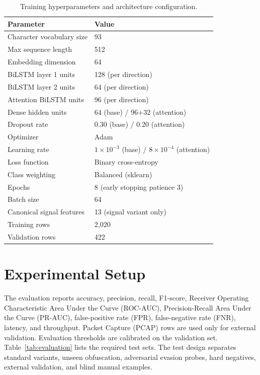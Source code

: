 \documentclass[conference]{IEEEtran}
\begin{document}
\begin{table}[!t]
\caption{Training hyperparameters and architecture configuration.}
\label{tab:hyperparams}
\centering
\begin{tabular}{ll}
\toprule
Parameter & Value \\
\midrule
Character vocabulary size & 93 \\
Max sequence length & 512 \\
Embedding dimension & 64 \\
BiLSTM layer 1 units & 128 (per direction) \\
BiLSTM layer 2 units & 64 (per direction) \\
Attention BiLSTM units & 96 (per direction) \\
Dense hidden units & 64 (base) / 96+32 (attention) \\
Dropout rate & 0.30 (base) / 0.20 (attention) \\
Optimizer & Adam \\
Learning rate & $1 \times 10^{-3}$ (base) / $8 \times 10^{-4}$ (attention) \\
Loss function & Binary cross-entropy \\
Class weighting & Balanced (sklearn) \\
Epochs & 8 (early stopping patience 3) \\
Batch size & 64 \\
Canonical signal features & 13 (signal variant only) \\
Training rows & 2,020 \\
Validation rows & 422 \\
\bottomrule
\end{tabular}
\end{table}

\section{Experimental Setup}

The evaluation reports accuracy, precision, recall, F1-score, Receiver
Operating Characteristic Area Under the Curve (ROC-AUC), Precision-Recall Area
Under the Curve (PR-AUC), false-positive rate (FPR), false-negative rate
(FNR), latency, and throughput. Packet Capture (PCAP) rows are used only for
external validation. Evaluation thresholds are calibrated on the validation
set. Table~\ref{tab:evaluation} lists the required test sets.
The test design separates standard variants, unseen obfuscation, adversarial
evasion probes, hard negatives, external validation, and blind manual examples.
\end{document}
